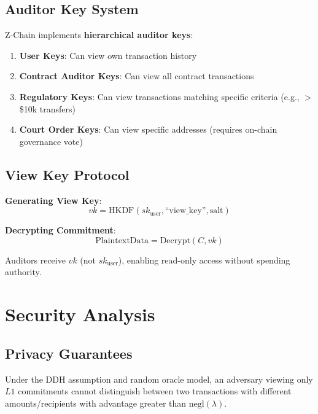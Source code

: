 \documentclass[11pt]{article}
\begin{document}
\subsection{Auditor Key System}

Z-Chain implements \textbf{hierarchical auditor keys}:

\begin{enumerate}
  \item \textbf{User Keys}: Can view own transaction history
  \item \textbf{Contract Auditor Keys}: Can view all contract transactions
  \item \textbf{Regulatory Keys}: Can view transactions matching specific criteria (e.g., $>$ \$10k transfers)
  \item \textbf{Court Order Keys}: Can view specific addresses (requires on-chain governance vote)
\end{enumerate}

\subsection{View Key Protocol}

\textbf{Generating View Key}:
\begin{equation}
vk = \text{HKDF}(sk_{\text{user}}, \text{``view\_key''}, \text{salt})
\end{equation}

\textbf{Decrypting Commitment}:
\begin{equation}
\text{PlaintextData} = \text{Decrypt}(C, vk)
\end{equation}

Auditors receive $vk$ (not $sk_{\text{user}}$), enabling read-only access without spending authority.

\section{Security Analysis}

\subsection{Privacy Guarantees}

\begin{theorem}
Under the DDH assumption and random oracle model, an adversary viewing only $L1$ commitments cannot distinguish between two transactions with different amounts/recipients with advantage greater than $\text{negl}(\lambda)$.
\end{theorem}
\end{document}
